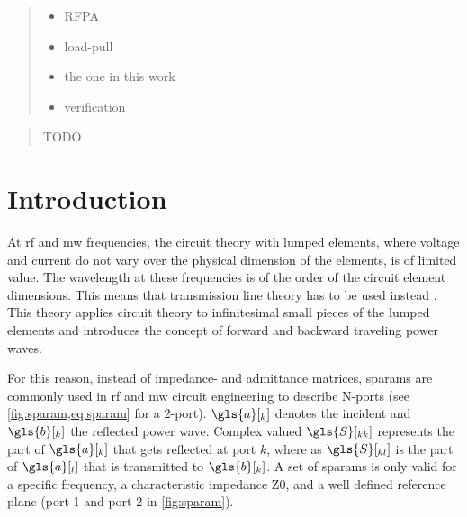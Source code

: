 \documentclass[12pt,a4paper,parskip=full,abstract=true,BCOR=12mm,twoside,open=right]{scrreprt}
\begin{document}
\begin{otherlanguage}{ngerman}
\begin{abstract}
    \begin{itemize}
        \item RFPA
        \item load-pull
        \item the one in this work
        \item verification
    \end{itemize}
\end{abstract}
\end{otherlanguage}

\renewcommand{\abstractname}{Acknowledgements}
\begin{abstract}
    TODO
\end{abstract}

\tableofcontents
\cleardoublepage
\listoffigures
\printacronyms
\printglossary[title={List of Symbols}]


\chapter{Introduction}
\label{chap:introduction}

At \gls{rf} and \gls{mw} frequencies, the circuit theory with lumped elements, where
voltage and current do not vary over the physical dimension of the elements, is of limited
value. The wavelength at these frequencies is of the order of the circuit
element dimensions. This means that transmission line theory has to be used instead \cite{pozar_mw_engineering_2011}.
This theory applies circuit theory to infinitesimal small pieces of the lumped elements
and introduces the concept of forward and backward traveling power waves.

For this reason, instead of impedance- and admittance matrices, \glspl{sparam}
are commonly used in \gls{rf} and \gls{mw} circuit engineering to describe
N-ports (see \cref{fig:sparam,eq:sparam} for a 2-port). $\gls{a}[_k]$ denotes the incident and
$\gls{b}[_k]$ the reflected power wave. Complex valued $\gls{S}[_{kk}]$ represents the
part of $\gls{a}[_k]$ that gets reflected at port $k$, where as $\gls{S}[_{kl}]$ is the part of $\gls{a}[_l]$ that
is transmitted to $\gls{b}[_k]$. A set of \glspl{sparam} is only valid for a specific frequency, a
characteristic impedance \gls{Z0}, and a well defined reference plane (port 1 and port 2 in \cref{fig:sparam}).
\end{document}
